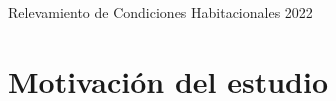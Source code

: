 \documentclass[aspectratio=169]{beamer}
\begin{document}
\begin{frame}{Relevamiento de Condiciones Habitacionales 2022}
\begin{minipage}{.35\linewidth}
        \end{minipage}
    \end{frame}

    \section{Motivación del estudio}
    \begin{frame}
        \tableofcontents[currentsection]
    \end{frame}
\end{document}
